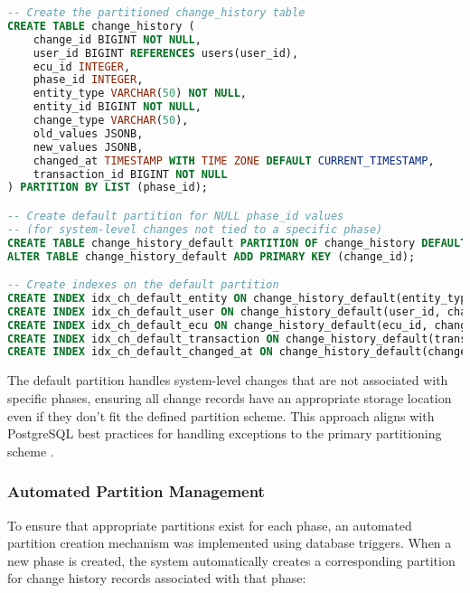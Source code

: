 \begin{lstlisting}[language=SQL, caption={Change History Table Partitioning Definition}, label={lst:change-history-partitioning}]
-- Create the partitioned change_history table
CREATE TABLE change_history (
    change_id BIGINT NOT NULL,
    user_id BIGINT REFERENCES users(user_id),
    ecu_id INTEGER,
    phase_id INTEGER, 
    entity_type VARCHAR(50) NOT NULL,
    entity_id BIGINT NOT NULL,
    change_type VARCHAR(50),
    old_values JSONB,
    new_values JSONB,
    changed_at TIMESTAMP WITH TIME ZONE DEFAULT CURRENT_TIMESTAMP,
    transaction_id BIGINT NOT NULL
) PARTITION BY LIST (phase_id);

-- Create default partition for NULL phase_id values 
-- (for system-level changes not tied to a specific phase)
CREATE TABLE change_history_default PARTITION OF change_history DEFAULT;
ALTER TABLE change_history_default ADD PRIMARY KEY (change_id);

-- Create indexes on the default partition
CREATE INDEX idx_ch_default_entity ON change_history_default(entity_type, entity_id, changed_at);
CREATE INDEX idx_ch_default_user ON change_history_default(user_id, changed_at);
CREATE INDEX idx_ch_default_ecu ON change_history_default(ecu_id, changed_at);
CREATE INDEX idx_ch_default_transaction ON change_history_default(transaction_id, changed_at);
CREATE INDEX idx_ch_default_changed_at ON change_history_default(changed_at);
\end{lstlisting}

The default partition handles system-level changes that are not associated with specific phases, ensuring all change records have an appropriate storage location even if they don't fit the defined partition scheme. This approach aligns with PostgreSQL best practices for handling exceptions to the primary partitioning scheme \cite{obe2017postgresql}.

\subsubsection{Automated Partition Management}
\label{subsubsec:automated-partition-management}

To ensure that appropriate partitions exist for each phase, an automated partition creation mechanism was implemented using database triggers. When a new phase is created, the system automatically creates a corresponding partition for change history records associated with that phase:

